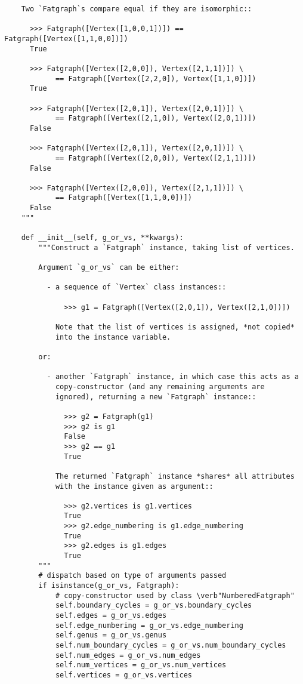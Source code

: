 \begin{lstlisting}
    Two `Fatgraph`s compare equal if they are isomorphic::

      >>> Fatgraph([Vertex([1,0,0,1])]) == Fatgraph([Vertex([1,1,0,0])])
      True

      >>> Fatgraph([Vertex([2,0,0]), Vertex([2,1,1])]) \
            == Fatgraph([Vertex([2,2,0]), Vertex([1,1,0])])
      True

      >>> Fatgraph([Vertex([2,0,1]), Vertex([2,0,1])]) \
            == Fatgraph([Vertex([2,1,0]), Vertex([2,0,1])])
      False

      >>> Fatgraph([Vertex([2,0,1]), Vertex([2,0,1])]) \
            == Fatgraph([Vertex([2,0,0]), Vertex([2,1,1])])
      False

      >>> Fatgraph([Vertex([2,0,0]), Vertex([2,1,1])]) \
            == Fatgraph([Vertex([1,1,0,0])])
      False
    """

    def __init__(self, g_or_vs, **kwargs):
        """Construct a `Fatgraph` instance, taking list of vertices.

        Argument `g_or_vs` can be either:

          - a sequence of `Vertex` class instances::  

              >>> g1 = Fatgraph([Vertex([2,0,1]), Vertex([2,1,0])])

            Note that the list of vertices is assigned, *not copied*
            into the instance variable.

        or:

          - another `Fatgraph` instance, in which case this acts as a
            copy-constructor (and any remaining arguments are
            ignored), returning a new `Fatgraph` instance::

              >>> g2 = Fatgraph(g1)
              >>> g2 is g1
              False
              >>> g2 == g1
              True

            The returned `Fatgraph` instance *shares* all attributes
            with the instance given as argument::

              >>> g2.vertices is g1.vertices
              True
              >>> g2.edge_numbering is g1.edge_numbering
              True
              >>> g2.edges is g1.edges
              True
        """
        # dispatch based on type of arguments passed
        if isinstance(g_or_vs, Fatgraph):
            # copy-constructor used by class \verb"NumberedFatgraph"
            self.boundary_cycles = g_or_vs.boundary_cycles
            self.edges = g_or_vs.edges
            self.edge_numbering = g_or_vs.edge_numbering
            self.genus = g_or_vs.genus
            self.num_boundary_cycles = g_or_vs.num_boundary_cycles
            self.num_edges = g_or_vs.num_edges
            self.num_vertices = g_or_vs.num_vertices
            self.vertices = g_or_vs.vertices


\end{lstlisting}
